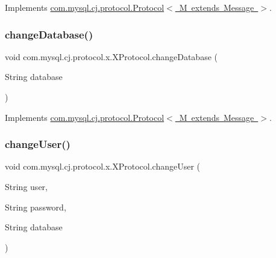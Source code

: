 Implements \mbox{\hyperlink{interfacecom_1_1mysql_1_1cj_1_1protocol_1_1_protocol_ab775cf8ac0a9bec0df8c4a473c804ae8}{com.\+mysql.\+cj.\+protocol.\+Protocol$<$ M extends Message $>$}}.

\mbox{\label{classcom_1_1mysql_1_1cj_1_1protocol_1_1x_1_1_x_protocol_a0370d4b1edd7b63667381cb3bd6b3085}} 
\subsubsection{\texorpdfstring{change\+Database()}{changeDatabase()}}
{\footnotesize\ttfamily void com.\+mysql.\+cj.\+protocol.\+x.\+X\+Protocol.\+change\+Database (\begin{DoxyParamCaption}\item[{String}]{database }\end{DoxyParamCaption})}



Implements \mbox{\hyperlink{interfacecom_1_1mysql_1_1cj_1_1protocol_1_1_protocol_a02558c9b17a492adb2e5b9cb0fb82778}{com.\+mysql.\+cj.\+protocol.\+Protocol$<$ M extends Message $>$}}.

\mbox{\label{classcom_1_1mysql_1_1cj_1_1protocol_1_1x_1_1_x_protocol_ada78c49db272f6f4a680c7d552f5be86}} 
\subsubsection{\texorpdfstring{change\+User()}{changeUser()}}
{\footnotesize\ttfamily void com.\+mysql.\+cj.\+protocol.\+x.\+X\+Protocol.\+change\+User (\begin{DoxyParamCaption}\item[{String}]{user,  }\item[{String}]{password,  }\item[{String}]{database }\end{DoxyParamCaption})}

